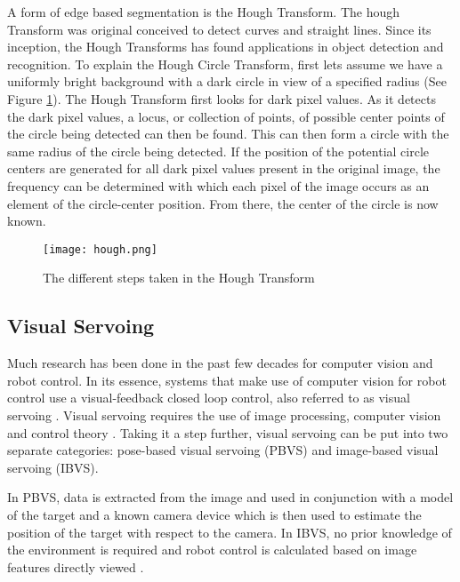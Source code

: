\documentclass[12pt]{article}
\begin{document}
A form of edge based segmentation is the Hough Transform. The hough Transform was original conceived to detect curves and straight lines. Since its inception, the Hough Transforms has found applications in object detection and recognition. To explain the Hough Circle Transform, first lets assume we have a uniformly bright background with a dark circle in view of a specified radius (See Figure \ref{fig.hough}). The Hough Transform first looks for dark pixel values. As it detects the dark pixel values, a locus, or collection of points, of possible center points of the circle being detected can then be found. This can then form a circle with the same radius of the circle being detected. If the position of the potential circle centers are generated for all dark pixel values present in the original image, the frequency can be determined with which each pixel of the image occurs as an element of the circle-center position. From there, the center of the circle is now known.


\begin{figure}[htp!]
	\begin{center}
		\texttt{[image: hough.png]}
		\caption{The different steps taken in the Hough Transform}  \label{fig.hough}
	\end{center}
\end{figure}




\subsection{Visual Servoing}

Much research has been done in the past few decades for computer vision and robot control. In its essence, systems that make use of computer vision for robot control use a visual-feedback closed loop control, also referred to as visual servoing \cite{TutorialVisualServo}. Visual servoing requires the use of image processing, computer vision and control theory \cite{VisualServoingBook}. Taking it a step further, visual servoing can be put into two separate categories: pose-based visual servoing (PBVS) and image-based visual servoing (IBVS).

In PBVS, data is extracted from the image and used in conjunction with a model of the target and a known camera device which is then used to estimate the position of the target with respect to the camera. In IBVS, no prior knowledge of the environment is required and robot control is calculated based on image features directly viewed \cite{TutorialVisualServo}\cite{FeatureDepthIBVS}.	
\end{document}
